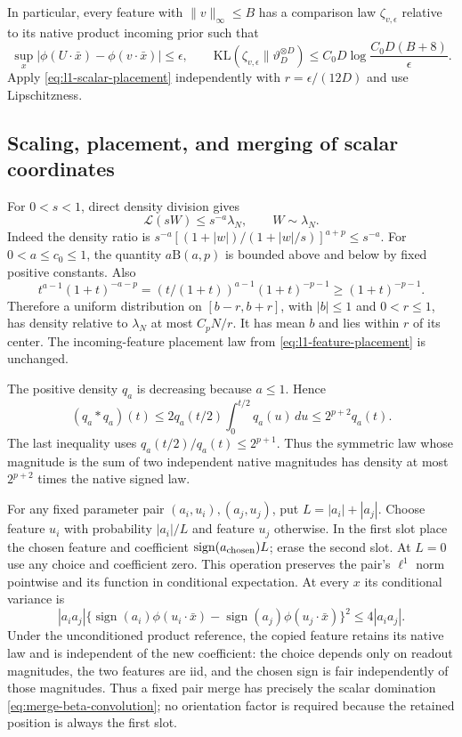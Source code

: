 In particular, every feature with $\|v\|_\infty\le B$ has a comparison
law $\zeta_{v,\epsilon}$ relative to its native product incoming prior
such that
\begin{equation}
 \sup_x|\phi(U\cdot\bar x)-\phi(v\cdot\bar x)|\le\epsilon,
 \qquad
 \mathrm{KL}(\zeta_{v,\epsilon}\|\vartheta_D^{\otimes D})
 \le C_0D\log\frac{C_0D(B+8)}\epsilon.
 \label{eq:l1-feature-placement}
\end{equation}
Apply \eqref{eq:l1-scalar-placement} independently with
$r=\epsilon/(12D)$ and use Lipschitzness.

\subsection{Scaling, placement, and merging of scalar coordinates}
For $0<s<1$, direct density division gives
\begin{equation}
 \mathcal L(sW)\le s^{-a}\lambda_N,
 \qquad W\sim\lambda_N.
 \label{eq:merge-beta-scaling}
\end{equation}
Indeed the density ratio is
$s^{-a}[(1+|w|)/(1+|w|/s)]^{a+p}\le s^{-a}$.
For $0<a\le c_0\le1$, the quantity $a\mathrm B(a,p)$ is bounded above
and below by fixed positive constants. Also
\[
 t^{a-1}(1+t)^{-a-p}
 =(t/(1+t))^{a-1}(1+t)^{-p-1}\ge(1+t)^{-p-1}.
\]
Therefore a uniform distribution on $[b-r,b+r]$, with $|b|\le1$ and
$0<r\le1$, has density relative to $\lambda_N$ at most $C_pN/r$.
It has mean $b$ and lies within $r$ of its center. The incoming-feature
placement law from \eqref{eq:l1-feature-placement} is unchanged.

The positive density $q_a$ is decreasing because $a\le1$. Hence
\begin{equation}
 (q_a*q_a)(t)
 \le2q_a(t/2)\int_0^{t/2}q_a(u)\,du
 \le2^{p+2}q_a(t).
 \label{eq:merge-beta-convolution}
\end{equation}
The last inequality uses
$q_a(t/2)/q_a(t)\le2^{p+1}$. Thus the symmetric law whose magnitude is
the sum of two independent native magnitudes has density at most
$2^{p+2}$ times the native signed law.

For any fixed parameter pair $(a_i,u_i),(a_j,u_j)$, put
$L=|a_i|+|a_j|$. Choose feature $u_i$ with probability $|a_i|/L$ and
feature $u_j$ otherwise. In the first slot place the chosen feature
and coefficient $\operatorname{sign}(a_{\rm chosen})L$; erase the second
slot. At $L=0$ use any choice and coefficient zero. This operation
preserves the pair's $\ell^1$ norm pointwise and its function in conditional
expectation. At every $x$ its conditional variance is
\begin{equation}
 |a_i a_j|\{\operatorname{sign}(a_i)\phi(u_i\cdot\bar x)
       -\operatorname{sign}(a_j)\phi(u_j\cdot\bar x)\}^2
 \le4|a_i a_j|.
 \label{eq:merge-pair-variance}
\end{equation}
Under the unconditioned product reference, the copied feature retains
its native law and is independent of the new coefficient: the choice
depends only on readout magnitudes, the two features are iid, and the
chosen sign is fair independently of those magnitudes. Thus a fixed
pair merge has precisely the scalar domination
\eqref{eq:merge-beta-convolution}; no orientation factor is required
because the retained position is always the first slot.

